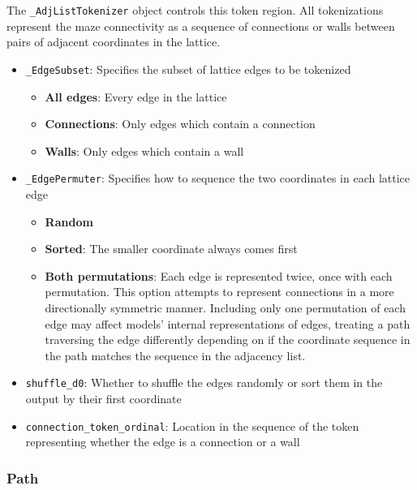 \documentclass[10pt,a4paper,onecolumn]{article}
\providecommand{\tightlist}{%
  \setlength{\itemsep}{0pt}\setlength{\parskip}{0pt}}
\begin{document}
The \texttt{\_AdjListTokenizer} object controls this token region. All
tokenizations represent the maze connectivity as a sequence of
connections or walls between pairs of adjacent coordinates in the
lattice.

\begin{itemize}
\tightlist
\item
  \texttt{\_EdgeSubset}: Specifies the subset of lattice edges to be
  tokenized

  \begin{itemize}
  \tightlist
  \item
    \textbf{All edges}: Every edge in the lattice
  \item
    \textbf{Connections}: Only edges which contain a connection
  \item
    \textbf{Walls}: Only edges which contain a wall
  \end{itemize}
\item
  \texttt{\_EdgePermuter}: Specifies how to sequence the two coordinates
  in each lattice edge

  \begin{itemize}
  \tightlist
  \item
    \textbf{Random}
  \item
    \textbf{Sorted}: The smaller coordinate always comes first
  \item
    \textbf{Both permutations}: Each edge is represented twice, once
    with each permutation. This option attempts to represent connections
    in a more directionally symmetric manner. Including only one
    permutation of each edge may affect models' internal representations
    of edges, treating a path traversing the edge differently depending
    on if the coordinate sequence in the path matches the sequence in
    the adjacency list.
  \end{itemize}
\item
  \texttt{shuffle\_d0}: Whether to shuffle the edges randomly or sort
  them in the output by their first coordinate
\item
  \texttt{connection\_token\_ordinal}: Location in the sequence of the
  token representing whether the edge is a connection or a wall
\end{itemize}

\hypertarget{pathtokenizer}{%
\subsubsection{Path}\label{pathtokenizer}}
\end{document}
